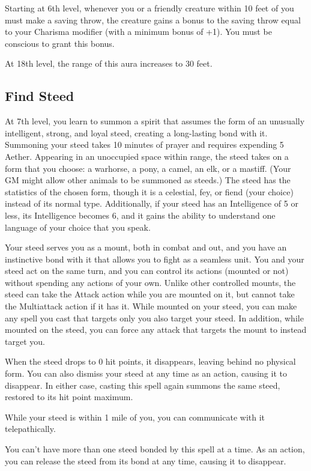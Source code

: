 Starting at 6th level, whenever you or a friendly creature within 10 feet of you must make a saving throw, the creature gains a bonus to the saving throw equal to your Charisma modifier (with a minimum bonus of +1). You must be conscious to grant this bonus.

At 18th level, the range of this aura increases to 30 feet.

\subsection{Find Steed}

At 7th level, you learn to summon a spirit that assumes the form of an unusually intelligent, strong, and loyal steed, creating a long-lasting bond with it. Summoning your steed takes 10 minutes of prayer and requires expending 5 Aether. Appearing in an unoccupied space within range, the steed takes on a form that you choose: a warhorse, a pony, a camel, an elk, or a mastiff. (Your GM might allow other animals to be summoned as steeds.) The steed has the statistics of the chosen form, though it is a celestial, fey, or fiend (your choice) instead of its normal type. Additionally, if your steed has an Intelligence of 5 or less, its Intelligence becomes 6, and it gains the ability to understand one language of your choice that you speak.

Your steed serves you as a mount, both in combat and out, and you have an instinctive bond with it that allows you to fight as a seamless unit. You and your steed act on the same turn, and you can control its actions (mounted or not) without spending any actions of your own. Unlike other controlled mounts, the steed can take the Attack action while you are mounted on it, but cannot take the Multiattack action if it has it. While mounted on your steed, you can make any spell you cast that targets only you also target your steed. In addition, while mounted on the steed, you can force any attack that targets the mount to instead target you.

When the steed drops to 0 hit points, it disappears, leaving behind no physical form. You can also dismiss your steed at any time as an action, causing it to disappear. In either case, casting this spell again summons the same steed, restored to its hit point maximum.

While your steed is within 1 mile of you, you can communicate with it telepathically.

You can't have more than one steed bonded by this spell at a time. As an action, you can release the steed from its bond at any time, causing it to disappear.

